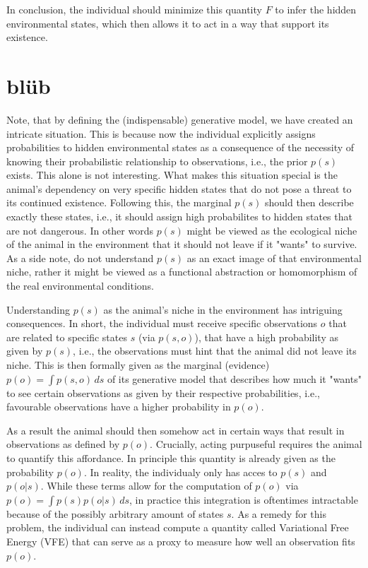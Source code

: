 In conclusion, the individual should minimize this quantity \(F\) to infer the hidden environmental states, which then allows it to act in a way that support its existence.



\chapter{blüb}


Note, that by defining the (indispensable) generative model, we have created an intricate situation. This is because now the individual explicitly assigns probabilities to hidden environmental states as a consequence of the necessity of knowing their probabilistic relationship to observations, i.e., the prior \(p(s)\) exists. This alone is not interesting. What makes this situation special is the animal's dependency on very specific hidden states that do not pose a threat to its continued existence. Following this, the marginal \(p(s)\) should then describe exactly these states, i.e., it should assign high probabilites to hidden states that are not dangerous. In other words \(p(s)\) might be viewed as the ecological niche of the animal in the environment that it should not leave if it "wants" to survive. As a side note, do not understand \(p(s)\) as an exact image of that environmental niche, rather it might be viewed as a functional abstraction or homomorphism of the real environmental conditions.

Understanding \(p(s)\) as the animal's niche in the environment has intriguing consequences. In short, the individual must receive specific observations \(o\) that are related to specific states \(s\) (via \(p(s,o)\)), that have a high probability as given by \(p(s)\), i.e., the observations must hint that the animal did not leave its niche. This is then formally given as the marginal (evidence) \(p(o) = \int p(s,o)\,ds\) of its generative model that describes how much it "wants" to see certain observations as given by their respective probabilities, i.e., favourable observations have a higher probability in \(p(o)\).

As a result the animal should then somehow act in certain ways that result in observations as defined by \(p(o)\). Crucially, acting purpuseful requires the animal to quantify this affordance. In principle this quantity is already given as the probability \(p(o)\). In reality, the individualy only has acces to \(p(s)\) and \(p(o|s)\). While these terms allow for the computation of \(p(o)\) via \(p(o) = \int p(s) p(o|s) \, ds\), in practice this integration is oftentimes intractable because of the possibly arbitrary amount of states \(s\). As a remedy for this problem, the individual can instead compute a quantity called Variational Free Energy (VFE) that can serve as a proxy to measure how well an observation fits \(p(o)\).




